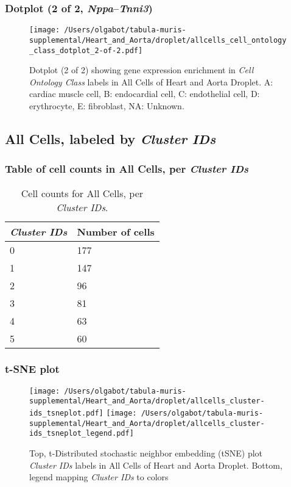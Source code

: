 \clearpage

\subsubsection{Dotplot (2 of 2, \emph{Nppa}--\emph{Tnni3})}
\begin{figure}[h]
\centering
\texttt{[image: /Users/olgabot/tabula-muris-supplemental/Heart\_and\_Aorta/droplet/allcells\_cell\_ontology\_class\_dotplot\_2-of-2.pdf]}

\caption{ Dotplot (2 of 2)  showing gene expression enrichment in \emph{Cell Ontology Class} labels in All Cells of Heart and Aorta Droplet. A: cardiac muscle cell, B: endocardial cell, C: endothelial cell, D: erythrocyte, E: fibroblast, NA: Unknown.}
\end{figure}


\clearpage

\subsection{All Cells, labeled by \emph{Cluster IDs}}
\subsubsection{Table of cell counts in All Cells, per \emph{Cluster IDs}}\begin{table}[h]
\centering
\label{my-label}
\begin{tabular}{@{}ll@{}}
\toprule

\emph{Cluster IDs}& Number of cells \\ \midrule
0 & 177 \\

1 & 147 \\

2 & 96 \\

3 & 81 \\

4 & 63 \\

5 & 60 \\
\bottomrule
\end{tabular}
\caption{Cell counts for All Cells, per \emph{Cluster IDs}.}
\end{table}

\clearpage
\subsubsection{t-SNE plot}
\begin{figure}[h]
\centering
\texttt{[image: /Users/olgabot/tabula-muris-supplemental/Heart\_and\_Aorta/droplet/allcells\_cluster-ids\_tsneplot.pdf]}
\texttt{[image: /Users/olgabot/tabula-muris-supplemental/Heart\_and\_Aorta/droplet/allcells\_cluster-ids\_tsneplot\_legend.pdf]}
\caption{Top, t-Distributed stochastic neighbor embedding (tSNE) plot  \emph{Cluster IDs} labels in All Cells of Heart and Aorta Droplet. Bottom, legend mapping \emph{Cluster IDs} to colors}
\end{figure}


